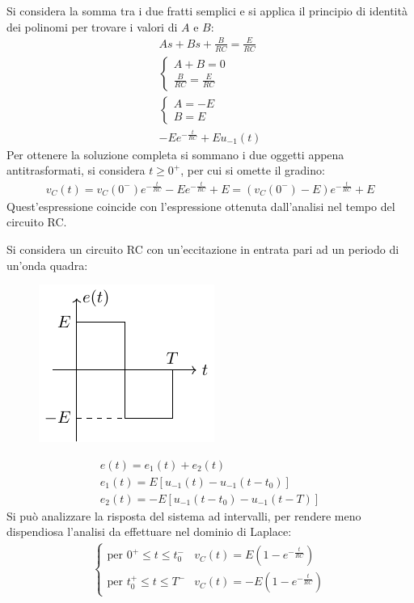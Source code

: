 \documentclass{article}
\numberwithin{equation}{subsection}
\begin{document}
Si considera la somma tra i due fratti semplici e si applica il principio di identità dei polinomi per trovare i valori di $A$ e $B$:
\begin{gather*}
    As+Bs+\displaystyle\frac{B}{RC}=\frac{E}{RC}\\
    \begin{cases}
        A+B=0\\
        \displaystyle\frac{B}{RC}=\frac{E}{RC}
    \end{cases}\\
    \begin{cases}
        A=-E\\
        B=E
    \end{cases}\\
    -Ee^{-\frac{t}{RC}}+Eu_{-1}(t)
\end{gather*}
Per ottenere la soluzione completa si sommano i due oggetti appena antitrasformati, si considera $t\geq0^+$, per cui si omette il gradino:
\begin{gather*}
    v_C(t)=v_C(0^-)e^{-\frac{t}{RC}}-Ee^{-\frac{t}{RC}}+E=(v_C(0^-)-E)e^{-\frac{t}{RC}}+E
\end{gather*}
Quest'espressione coincide con l'espressione ottenuta dall'analisi nel tempo del circuito RC. 



Si considera un circuito RC con un'eccitazione in entrata pari ad un periodo di un'onda quadra:
\begin{figure}[H]%
    \centering
    \includegraphics{onda-quadra.pdf}%
    \label{fig:onda-quadra}
\end{figure}
\begin{gather*}
    e(t)=e_1(t)+e_2(t)\\
    e_1(t)=E[u_{-1}(t)-u_{-1}(t-t_0)]\\
    e_2(t)=-E[u_{-1}(t-t_0)-u_{-1}(t-T)]
\end{gather*}
Si può analizzare la risposta del sistema ad intervalli, per rendere meno dispendiosa l'analisi da effettuare nel dominio di Laplace:
\begin{gather*}
    \begin{cases}
        \mbox{per }0^+\leq t\leq t_0^-& v_C(t)=E\left(1-e^{-\frac{t}{RC}}\right)\\
        \mbox{per }t_0^+\leq t\leq T^-& v_C(t)=-E\left(1-e^{-\frac{t}{RC}}\right)
    \end{cases}
\end{gather*}
\end{document}
